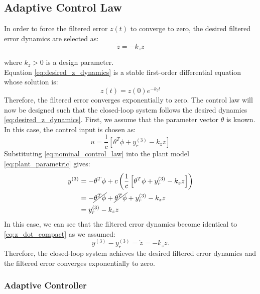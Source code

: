 \subsection{Adaptive Control Law}

In order to force the filtered error \(z(t)\) to converge to zero, the desired filtered error dynamics are selected as:
\begin{equation}
\dot{z}
=
-k_z z
\label{eq:desired_z_dynamics}
\end{equation}

where \(k_z>0\) is a design parameter.
\\

\noindent Equation \eqref{eq:desired_z_dynamics} is a stable first-order differential equation whose solution is:
\begin{equation}
z(t)
=
z(0)e^{-k_z t}
\end{equation}
Therefore, the filtered error converges exponentially to zero. The control law will now be designed such that the closed-loop system follows the desired dynamics \eqref{eq:desired_z_dynamics}.
\noindent First, we assume that the parameter vector \(\theta\) is known. In this case, the control input is chosen as:
\begin{equation}
u
=
\frac{1}{c}
\left[
\theta^T\phi
+
y_r^{(3)}
-
k_z z
\right]
\label{eq:nominal_control_law}
\end{equation}
Substituting \eqref{eq:nominal_control_law} into the plant model \eqref{eq:plant_parametric} gives:
\begin{align}
y^{(3)}
&=
-\theta^T\phi
+
c
\left(
\frac{1}{c}
\left[
\theta^T\phi
+
y_r^{(3)}
-
k_z z
\right]
\right) \\
&=
-\cancel{\theta^T\phi}
+
\cancel{\theta^T\phi}
+
y_r^{(3)}
-
k_z z \\
&=
y_r^{(3)}
-
k_z z
\end{align}
In this case, we can see that the filtered error dynamics become identical to \eqref{eq:z_dot_compact} as we assumed:
\begin{equation}
y^{(3)} - y_r^{(3)}
=
\dot{z}
=
-k_z z.
\end{equation}
Therefore, the closed-loop system achieves the desired filtered error dynamics and the filtered error converges exponentially to zero.

\subsubsection*{Adaptive Controller}

